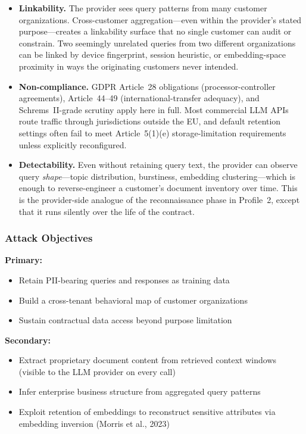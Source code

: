 \begin{prosebox}
\begin{itemize}[leftmargin=1.4em, itemsep=5pt]
  \item \textbf{Linkability.} The provider sees query patterns from many
        customer organizations. Cross-customer aggregation---even within
        the provider's stated purpose---creates a linkability surface that
        no single customer can audit or constrain. Two seemingly unrelated
        queries from two different organizations can be linked by device
        fingerprint, session heuristic, or embedding-space proximity in
        ways the originating customers never intended.
  \item \textbf{Non-compliance.} GDPR Article~28 obligations
        (processor-controller agreements), Article~44--49
        (international-transfer adequacy), and Schrems~II-grade scrutiny
        apply here in full. Most commercial LLM APIs route traffic through
        jurisdictions outside the EU, and default retention settings often
        fail to meet Article~5(1)(e) storage-limitation requirements
        unless explicitly reconfigured.
  \item \textbf{Detectability.} Even without retaining query text, the
        provider can observe query \emph{shape}---topic distribution,
        burstiness, embedding clustering---which is enough to reverse-engineer
        a customer's document inventory over time. This is the
        provider-side analogue of the reconnaissance phase in Profile~2,
        except that it runs silently over the life of the contract.
\end{itemize}
\end{prosebox}

\subsubsection{Attack Objectives}

\begin{prosebox}
\textbf{Primary:}
\begin{itemize}[leftmargin=1.4em, itemsep=2pt]
  \item Retain PII-bearing queries and responses as training data
  \item Build a cross-tenant behavioral map of customer organizations
  \item Sustain contractual data access beyond purpose limitation
\end{itemize}
\textbf{Secondary:}
\begin{itemize}[leftmargin=1.4em, itemsep=2pt]
  \item Extract proprietary document content from retrieved context windows
        (visible to the LLM provider on every call)
  \item Infer enterprise business structure from aggregated query patterns
  \item Exploit retention of embeddings to reconstruct sensitive attributes
        via embedding inversion (Morris et al., 2023)
\end{itemize}
\end{prosebox}

